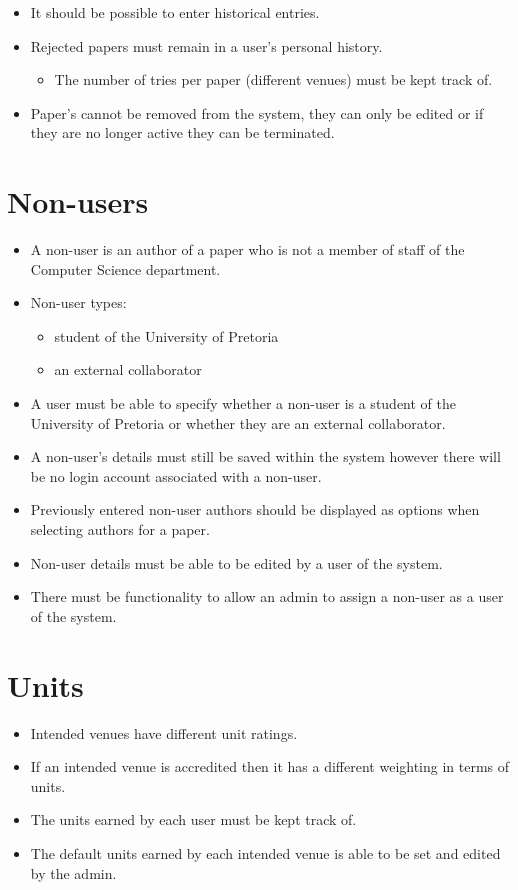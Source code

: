\documentclass{article}
\begin{document}
\begin{itemize}
		\item It should be possible to enter historical entries.
		\item Rejected papers must remain in a user's personal history.
		\begin{itemize}
			\item The number of tries per paper (different venues) must be kept track of.
		\end{itemize}
		\item Paper's cannot be removed from the system, they can only be edited or if they are no longer active they can be terminated.
	\end{itemize}
	
\cleardoublepage
\section{Non-users}\label{sec:non-users}
	\begin{itemize}
		\item A non-user is an author of a paper who is not a member of staff of the Computer Science department.
		\item Non-user types:
		\begin{itemize}
			\item student of the University of Pretoria
			\item an external collaborator
		\end{itemize}
		\item A user must be able to specify whether a non-user is a student of the University of Pretoria or whether they are an external collaborator.
		\item A non-user's details must still be saved within the system however there will be no login account associated with a non-user.
		\item Previously entered non-user authors should be displayed as options when selecting authors for a paper.
		\item Non-user details must be able to be edited by a user of the system.
		\item There must be functionality to allow an admin to assign a non-user as a user of the system.
	\end{itemize}
	
\section{Units}\label{sec:units}
	\begin{itemize}
		\item Intended venues have different unit ratings.
		\item If an intended venue is accredited then it has a different weighting in terms of units.
		\item The units earned by each user must be kept track of.
		\item The default units earned by each intended venue is able to be set and edited by the admin.
	\end{itemize}
	
\end{document}
